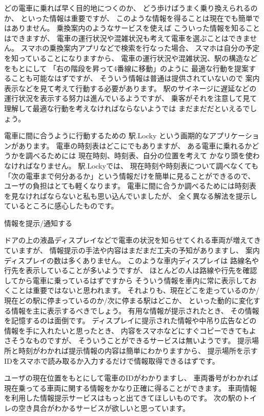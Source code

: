 \documentclass[twocolumn,10pt]{jarticle}
\begin{document}
  どの電車に乗れば早く目的地につくのか、 どう歩けばうまく乗り換えられるのか、 といった情報は重要ですが、 このような情報を得ることは現在でも簡単ではありません。 乗換案内のようなサービスを使えば こういった情報を知ることはできますが、 電車の運行状況や混雑状況も考えて電車を選ぶことはできません。
  スマホの乗換案内アプリなどで検索を行なった場合、 スマホは自分の予定を知っていることになりますから、 電車の運行状況や混雑状況、駅の構造などをもとにして 「右の階段を昇って4番線に移動」のように 最適な行動を提案することも可能なはずですが、 そういう情報は普通は提供されていないので 案内表示などを見て考えて行動する必要があります。 駅のサイネージに遅延などの運行状況を表示する努力は進んでいるようですが、 乗客がそれを注意して見て理解して最適な行動を考えなければならないようでは まだまだだといえるでしょう。

  電車に間に合うように行動するための 駅.Locky という画期的なアプリケーションがあります。 電車の時刻表はどこにでもありますが、 ある電車に乗れるかどうかを調べるためには 現在時刻、時刻表、自分の位置を考えて かなり頭を使わなければなりません。 駅.Lockyでは、 現在時刻や時刻表について調べなくても 「次の電車まで何分あるか」という情報だけを簡単に見ることができるので、 ユーザの負担はとても軽くなります。 電車に間に合うか調べるためには時刻表を見なければならないと私も思い込んでいましたが、 全く異なる解法を提示しているところに感心したものです。

  情報を提示/通知する

  ドアの上の液晶ディスプレイなどで電車の状況を知らせてくれる車両が増えてきていますが、 情報提示の手法や内容はまだまだ工夫の予知がありますし、 案内ディスプレイの数は多くありません。 このような車内ディスプレイは 路線名や行先を表示していることが多いようですが、 ほとんどの人は路線や行先を確認してから電車に乗っているはずですから そういう情報を車内に常に表示しておくことは重要ではないと思われます。 それよりも、現在どこを走っているのか/現在どの駅に停まっているのか/次に停まる駅はどこか、 といった動的に変化する情報を主に表示するべきでしょう。
  有用な情報が提示されたとき、 その情報を記憶するのは面倒です。 ディスプレイに提示された情報や中吊り広告などの情報を手に入れたいと思ったとき、 内容をスマホなどにすぐコピーできてもよさそうなものですが、 そういうことができるサービスは無いようです。 提示場所と時刻がわかれば提示情報の内容は簡単にわかりますから、 提示場所を示すIDをスマホで読み取るか入力するだけで情報取得できるはずです。

  ユーザの現在位置をもとにして電車のIDがわかりますし、 車両番号がわかれば現在乗ってる車両に関する情報をかなり正確に得ることができます。 車両情報を利用した情報提示サービスはもっと出てきてほしいものです。 次の駅のトイレの空き具合がわかるサービスが欲しいと思っています。
\end{document}
